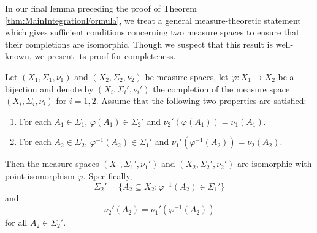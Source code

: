 \documentclass[smallextended]{svjour3}
\theoremstyle{remark}
\begin{document}
\noindent In our final lemma preceding the proof of Theorem \ref{thm:MainIntegrationFormula}, we treat a general measure-theoretic statement which gives sufficient conditions concerning two measure spaces to ensure that their completions are isomorphic. Though we suspect that this result is well-known, we present its proof for completeness.

\begin{lemma}\label{lem:PushforwardLemma}
Let $(X_1,\Sigma_1,\nu_1)$ and $(X_2,\Sigma_2,\nu_2)$ be measure spaces, let $\varphi:X_1\to X_2$ be a bijection and denote by $(X_i,\Sigma_i',\nu_i')$ the completion of the measure space $(X_i,\Sigma_i,\nu_i)$ for $i=1,2$. Assume that the following two properties are satisfied:
\begin{enumerate}
\item\label{property:PushforwardLemma1} For each $A_1\in\Sigma_1$, $\varphi(A_1)\in\Sigma_2'$ and $\nu_2'(\varphi(A_1))=\nu_1(A_1).$
\item\label{property:PushforwardLemma2} For each $A_2\in\Sigma_2$, $\varphi^{-1}(A_2)\in \Sigma_1'$ and $\nu_1'(\varphi^{-1}(A_2))=\nu_2(A_2)$.
\end{enumerate}
Then the measure spaces $(X_1,\Sigma_1',\nu_1')$ and $(X_2,\Sigma_2',\nu_2')$ are isomorphic with point isomorphism $\varphi$. Specifically,
\begin{equation}\label{eq:PushforwardLemma1}
\Sigma_2'=\{A_2\subseteq X_2: \varphi^{-1}(A_2)\in\Sigma_1'\}
\end{equation}
and
\begin{equation}\label{eq:PushforwardLemma2}
\nu_2'(A_2)=\nu_1'(\varphi^{-1}(A_2))
\end{equation}
for all $A_2\in\Sigma_2'$.
\end{lemma}
\end{document}

